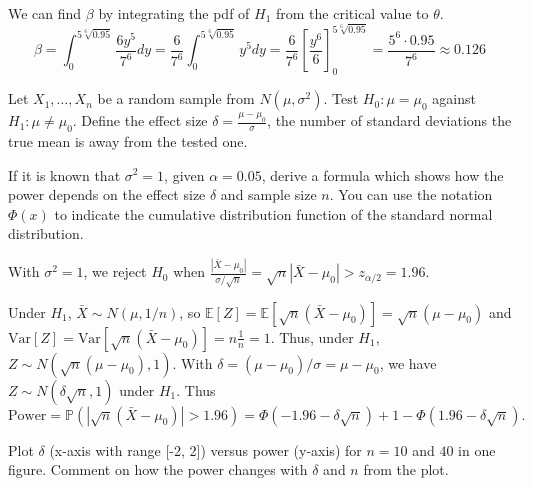 \documentclass{article}
\newcommand{\E}{\mathbb{E}}
\newcommand{\V}{\text{Var}}
\renewcommand{\P}{\mathbb{P}}
\begin{document}
\begin{probset}
\begin{prob}[\textbf{6.4.24}]
\begin{subprobset}
\begin{subprob}
        \begin{soln}
            We can find $\beta$ by integrating the pdf of $H_1$ from the critical value to $\theta$.
            \[
                \beta = \int_{0}^{5\sqrt[6]{0.95}} \frac{6y^5}{7^6} dy = \frac{6}{7^6} \int_{0}^{5\sqrt[6]{0.95}} y^5 dy = \frac{6}{7^6} \left[\frac{y^6}{6}\right]_{0}^{5\sqrt[6]{0.95}} = \frac{5^6 \cdot 0.95}{7^6} \approx 0.126
            \]
        \end{soln}
    \end{subprob}
    \end{subprobset}
\end{prob}

\newpage

\begin{prob}
    Let $X_1, \ldots, X_n$ be a random sample from $N (\mu, \sigma^2)$. Test $H_0: \mu = \mu_0$ against $H_1: \mu \neq \mu_0$. Define the effect size $\delta = \frac{\mu - \mu_0}{\sigma}$, the number of standard deviations the true mean is away from the tested one.

    \begin{subprobset}
    \begin{subprob}
        If it is known that $\sigma^2 = 1$, given $\alpha = 0.05$, derive a formula which shows how the power depends on the effect size $\delta$ and sample size $n$. You can use the notation $\Phi(x)$ to indicate the cumulative distribution function of the standard normal distribution.

        \begin{soln}
            With $\sigma^2 = 1$, we reject $H_0$ when $\frac{|\bar{X} - \mu_0|}{\sigma/\sqrt{n}} = \sqrt{n}|\bar{X} - \mu_0| > z_{\alpha/2} = 1.96$. 
            
            Under $H_1$, $\bar{X} \sim N(\mu, 1/n)$, so $\E[Z] = \E[\sqrt{n}(\bar{X} - \mu_0)] = \sqrt{n}(\mu - \mu_0)$ and $\V[Z] = \V[\sqrt{n}(\bar{X} - \mu_0)] = n\frac{1}{n} = 1$. Thus, under $H_1$, $Z \sim N(\sqrt{n}(\mu - \mu_0), 1)$. With $\delta = (\mu - \mu_0)/\sigma = \mu - \mu_0$, we have $Z \sim N(\delta\sqrt{n}, 1)$ under $H_1$. Thus
            \[
                \text{Power} = \P\left(|\sqrt{n}(\bar{X} - \mu_0)| > 1.96\right) = \Phi(-1.96 - \delta\sqrt{n}) + 1 - \Phi(1.96 - \delta\sqrt{n}).
            \]
        \end{soln}
    \end{subprob}

    \begin{subprob}
        Plot $\delta$ (x-axis with range [-2, 2]) versus power (y-axis) for $n = 10$ and $40$ in one figure. Comment on how the power changes with $\delta$ and $n$ from the plot.


\end{subprob}
\end{subprobset}
\end{prob}
\end{probset}
\end{document}
